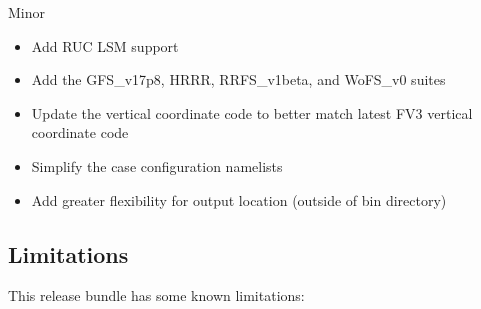 Minor
\begin{itemize}
\item Add RUC LSM support
\item Add the GFS\_v17p8, HRRR, RRFS\_v1beta, and WoFS\_v0 suites 
\item Update the vertical coordinate code to better match latest FV3 vertical coordinate code
\item Simplify the case configuration namelists
\item Add greater flexibility for output location (outside of bin directory)
\end{itemize}

\subsection{Limitations}

This release bundle has some known limitations:

